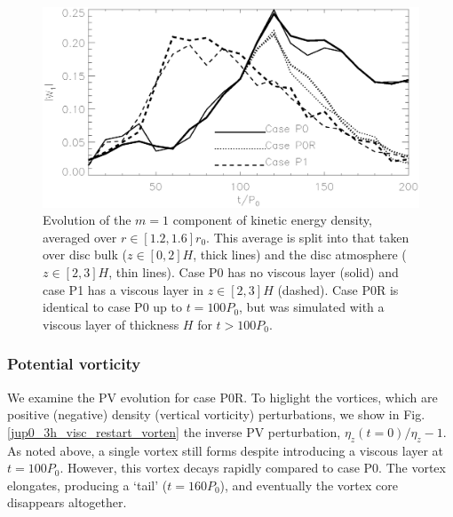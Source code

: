 \begin{figure}
  \centering
  \includegraphics[width=\linewidth]{figures/pdisk_kerz_cases_planet_m1}
  \caption{Evolution of the $m=1$ component of kinetic energy density,
    averaged over $r\in[1.2,1.6]r_0$. This average
    is split into that taken over disc bulk ($z\in[0,2]H$, thick
    lines) and the disc atmosphere ($z\in[2,3]H$, thin lines). Case P0
    has no viscous layer (solid) and case P1 has a viscous layer in
    $z\in[2,3]H$ (dashed). Case P0R is identical to case P0 up to $t=100P_0$,
    but was simulated with a viscous layer of thickness
    $H$ for $t>100P_0$. 
\label{pdisk_kerz_cases_planet}}
\end{figure}

\subsubsection{Potential vorticity}
We examine the PV evolution for case P0R. To higlight the vortices, which are positive (negative)
density (vertical vorticity) perturbations, we show in
Fig. \ref{jup0_3h_visc_restart_vorten} the inverse PV perturbation,
$\eta_z(t=0)/\eta_z - 1$. As noted above, a single vortex still forms
despite introducing a viscous layer at $t=100P_0$. However, this
vortex decays rapidly compared to case P0. The vortex elongates,
producing a `tail' ($t=160P_0$), and eventually the vortex core
disappears altogether. 


